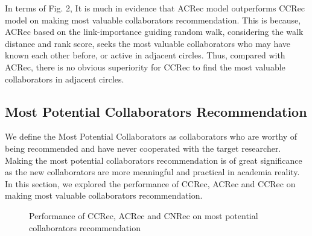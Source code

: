 \documentclass[review]{elsarticle}
\begin{document}
In terms of Fig. 2, It is  much in evidence that ACRec model outperforms CCRec model on making most valuable collaborators recommendation. This is because, ACRec based on the link-importance guiding random walk, considering the walk distance and rank score, seeks the most valuable collaborators who may have known each other before, or active in adjacent circles. Thus, compared with ACRec, there is no obvious superiority for CCRec to find the most valuable collaborators in adjacent circles.

\subsection{Most Potential Collaborators Recommendation}
We define the Most Potential Collaborators as collaborators who are worthy of being recommended and have never cooperated with the target researcher. Making the most potential collaborators recommendation is of great significance as the new collaborators are more meaningful and practical in academia reality. In this section, we explored the performance of CCRec, ACRec and CCRec on making most valuable collaborators recommendation.

\begin{figure}
\centering
{}
\caption{Performance of CCRec, ACRec and CNRec on most potential collaborators recommendation}
\label{fig:3}       %
\end{figure}
\end{document}
